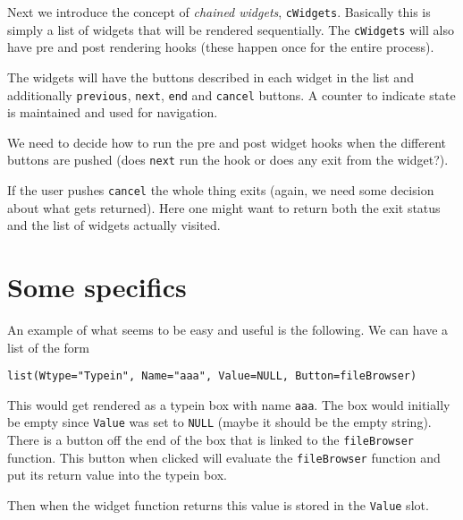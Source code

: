 \documentclass{article}
\begin{document}
Next we introduce the concept of {\em chained widgets},
\verb+cWidgets+. 
Basically this is simply a list of widgets that will be rendered
sequentially. 
The \verb+cWidgets+ will also have pre and post rendering hooks (these
happen once for the entire process).

The widgets will have the buttons described in each widget in the list
and additionally \verb+previous+, \verb+next+, \verb+end+ and
\verb+cancel+ buttons.
A counter to indicate state is maintained and used for navigation.

We need to decide how to run the pre and post widget hooks when the
different buttons are pushed (does \verb+next+ run the hook or does
any exit from the widget?).

If the user pushes \verb+cancel+ the whole thing exits (again, we need
some decision about what gets returned). Here one might want to return
both the exit status and the list of widgets actually visited.


\section*{Some specifics}

An example of what seems to be easy and useful is the following.
We can have a list of the form
\begin{verbatim}
list(Wtype="Typein", Name="aaa", Value=NULL, Button=fileBrowser)
\end{verbatim}
This would get rendered as a typein box with name \verb+aaa+. The box
would initially be empty since \verb+Value+ was set to \verb+NULL+
(maybe it should be the empty string). There is a button off the end
of the box that is linked to the \verb+fileBrowser+ function.
This button when clicked will evaluate the \verb+fileBrowser+ function
and put its return value into the typein box.

Then when the widget function returns this value is stored in the
\verb+Value+ slot.
\end{document}
